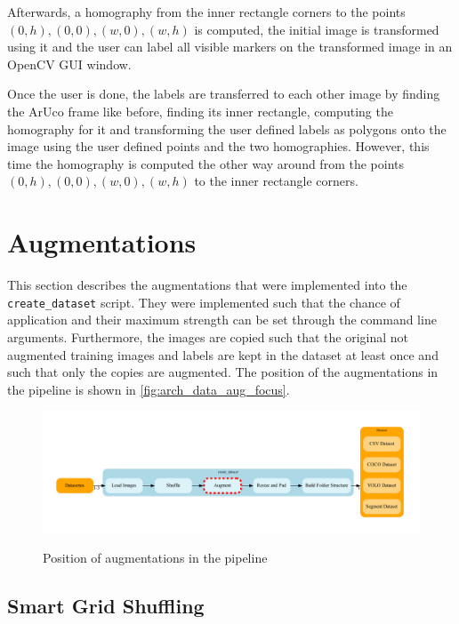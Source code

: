 \documentclass[10pt]{book}
\begin{document}

Afterwards, a homography from the inner rectangle corners to the points $(0,h), (0,0), (w,0), (w,h)$ is computed, the initial image is transformed using it and the user can label all visible markers on the transformed image in an \ac{OpenCV} \ac{GUI} window.

Once the user is done, the labels are transferred to each other image by finding the \ac{ArUco} frame like before, finding its inner rectangle, computing the homography for it and transforming the user defined labels as polygons onto the image using the user defined points and the two homographies. However, this time the homography is computed the other way around from the points $(0,h), (0,0), (w,0), (w,h)$ to the inner rectangle corners.

\section{Augmentations}

This section describes the augmentations that were implemented into the \texttt{create\_dataset} script. They were implemented such that the chance of application and their maximum strength can be set through the command line arguments. Furthermore, the images are copied such that the original not augmented training images and labels are kept in the dataset at least once and such that only the copies are augmented. The position of the augmentations in the pipeline is shown in \autoref{fig:arch_data_aug_focus}.

\begin{figure}
  \caption{Position of augmentations in the pipeline}
  \includegraphics[width=\textwidth]{graph/arch_data_aug_focus}
  \label{fig:arch_data_aug_focus}
\end{figure}

\subsection{Smart Grid Shuffling}
\end{document}
